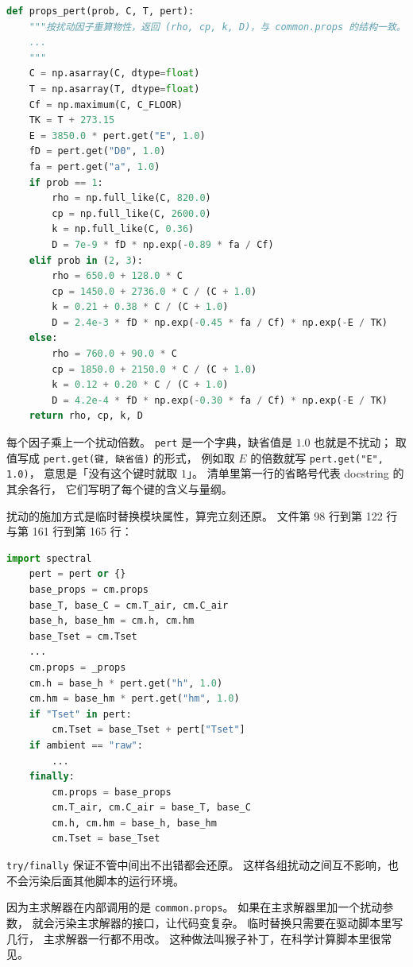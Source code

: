 \begin{lstlisting}[language=Python]
def props_pert(prob, C, T, pert):
    """按扰动因子重算物性，返回 (rho, cp, k, D)，与 common.props 的结构一致。
    ...
    """
    C = np.asarray(C, dtype=float)
    T = np.asarray(T, dtype=float)
    Cf = np.maximum(C, C_FLOOR)
    TK = T + 273.15
    E = 3850.0 * pert.get("E", 1.0)
    fD = pert.get("D0", 1.0)
    fa = pert.get("a", 1.0)
    if prob == 1:
        rho = np.full_like(C, 820.0)
        cp = np.full_like(C, 2600.0)
        k = np.full_like(C, 0.36)
        D = 7e-9 * fD * np.exp(-0.89 * fa / Cf)
    elif prob in (2, 3):
        rho = 650.0 + 128.0 * C
        cp = 1450.0 + 2736.0 * C / (C + 1.0)
        k = 0.21 + 0.38 * C / (C + 1.0)
        D = 2.4e-3 * fD * np.exp(-0.45 * fa / Cf) * np.exp(-E / TK)
    else:
        rho = 760.0 + 90.0 * C
        cp = 1850.0 + 2150.0 * C / (C + 1.0)
        k = 0.12 + 0.20 * C / (C + 1.0)
        D = 4.2e-4 * fD * np.exp(-0.30 * fa / Cf) * np.exp(-E / TK)
    return rho, cp, k, D
\end{lstlisting}

每个因子乘上一个扰动倍数。
\texttt{pert} 是一个字典，缺省值是 $1.0$ 也就是不扰动；
取值写成 \texttt{pert.get(键, 缺省值)} 的形式，
例如取 $E$ 的倍数就写 \texttt{pert.get("E", 1.0)}，
意思是「没有这个键时就取 $1$」。
清单里第一行的省略号代表 docstring 的其余各行，
它们写明了每个键的含义与量纲。

扰动的施加方式是临时替换模块属性，算完立刻还原。
文件第 98 行到第 122 行与第 161 行到第 165 行：

\begin{lstlisting}[language=Python]
    import spectral
    pert = pert or {}
    base_props = cm.props
    base_T, base_C = cm.T_air, cm.C_air
    base_h, base_hm = cm.h, cm.hm
    base_Tset = cm.Tset
    ...
    cm.props = _props
    cm.h = base_h * pert.get("h", 1.0)
    cm.hm = base_hm * pert.get("hm", 1.0)
    if "Tset" in pert:
        cm.Tset = base_Tset + pert["Tset"]
    if ambient == "raw":
        ...
    finally:
        cm.props = base_props
        cm.T_air, cm.C_air = base_T, base_C
        cm.h, cm.hm = base_h, base_hm
        cm.Tset = base_Tset
\end{lstlisting}

\texttt{try/finally} 保证不管中间出不出错都会还原。
这样各组扰动之间互不影响，也不会污染后面其他脚本的运行环境。

因为主求解器在内部调用的是 \texttt{common.props}。
如果在主求解器里加一个扰动参数，
就会污染主求解器的接口，让代码变复杂。
临时替换只需要在驱动脚本里写几行，
主求解器一行都不用改。
这种做法叫猴子补丁，在科学计算脚本里很常见。

